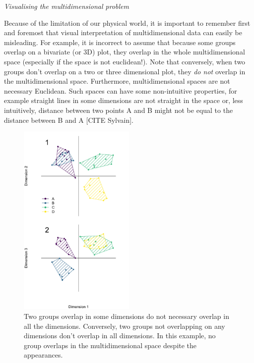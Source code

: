 \documentclass[12pt,letterpaper]{article}
\renewcommand{\subsection}[1]{%
\bigskip
\begin{center}
\begin{large}
\normalfont\itshape #1
\end{large}
\end{center}}
\begin{document}
\subsection{Visualising the multidimensional problem}
\label{visualisation}
Because of the limitation of our physical world, it is important to remember first and foremost that visual interpretation of multidimensional data can easily be misleading.
For example, it is incorrect to assume that because some groups overlap on a bivariate (or 3D) plot, they overlap in the whole multidimensional space (especially if the space is not euclidean!).
Note that conversely, when two groups don't overlap on a two or three dimensional plot, they \textit{do not} overlap in the multidimensional space.
Furthermore, multidimensional spaces are not necessary Euclidean.
Such spaces can have some non-intuitive properties, for example straight lines in some dimensions are not straight in the space or, less intuitively, distance between two points A and B might not be equal to the distance between B and A [CITE Sylvain].

\begin{figure}[!htbp]
\centering
   \includegraphics[width=0.5\textwidth]{Figures/dimensionsOverlap.pdf}
\caption{\small{Two groups overlap in some dimensions do not necessary overlap in all the dimensions. Conversely, two groups not overlapping on any dimensions don't overlap in all dimensions. In this example, no group overlaps in the multidimensional space despite the appearances.}}
\label{Fig:RF_results_best}
\end{figure}
\end{document}

